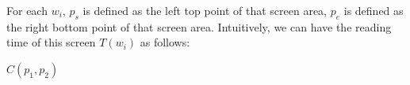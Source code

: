 \documentclass{sigchi}
\begin{document}
For each $w_i$, $p_s$ is defined as the left top point of that screen area, $p_e$ is defined as the right bottom point of that screen area. Intuitively, 
we can have the reading time of  this screen $T(w_i)$ as follows:


$C(p_1,p_2)$







\end{document}

